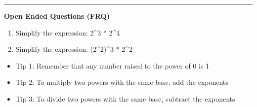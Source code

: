 \documentclass[10pt]{article}
\begin{document}
\vspace{-0.2cm}
\hrule
\vspace{0.2cm}
\textbf{\small Open Ended Questions (FRQ)}
\begin{enumerate}[label=\textbf{Q\arabic*.}, start=9, itemsep=5pt, topsep=0pt]

  \item \small Simplify the expression: 2^3 * 2^4 \vspace{1.2000000000000002cm}

  \item \small Simplify the expression: (2^2)^3 * 2^2 \vspace{1.2000000000000002cm}

\end{enumerate}

\vfill

\begin{tcolorbox}[colback=blue!5, colframe=mainblue!50, title=\small \textbf{Chef's Tips}, fonttitle=\bfseries, bottom=1mm]
\begin{itemize}[noitemsep, topsep=2pt, leftmargin=0.5cm]
  \item \scriptsize Tip 1: Remember that any number raised to the power of 0 is 1\item \scriptsize Tip 2: To multiply two powers with the same base, add the exponents\item \scriptsize Tip 3: To divide two powers with the same base, subtract the exponents
\end{itemize}
\end{tcolorbox}
\end{document}
